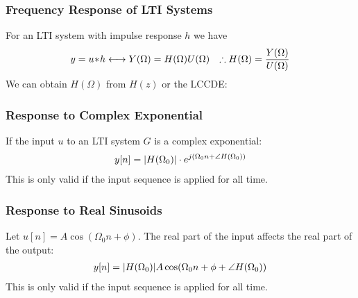     \subsubsection{Frequency Response of LTI Systems} 
        For an LTI system with impulse response $h$ we have
        \begin{align*}
            y = u\!\ast\! h \longleftrightarrow Y(\Omega) = H(\Omega)U(\Omega) && \therefore H(\Omega) = \frac{Y(\Omega)}{U(\Omega)}
        \end{align*}
        We can obtain $H(\Omega)$ from $H(z)$ or the LCCDE:

    \subsubsection{Response to Complex Exponential}
        If the input $u$ to an LTI system $G$ is a complex exponential:
        \begin{align*}
            y[n] = \abs{H(\Omega_0)} \cdot e^{j(\Omega_0 n +  \angle H(\Omega_0))}
        \end{align*}
        This is only valid if the input sequence is applied for all time.


    \subsubsection{Response to Real Sinusoids}
        Let $u[n] = A\cos(\Omega_0 n + \phi)$. The real part of the input affects the real part of the output:
        \begin{align*}
            y[n] = \abs{H(\Omega_0)}A\cos(\Omega_0 n + \phi + \angle H(\Omega_0))
        \end{align*}
        This is only valid if the input sequence is applied for all time.
